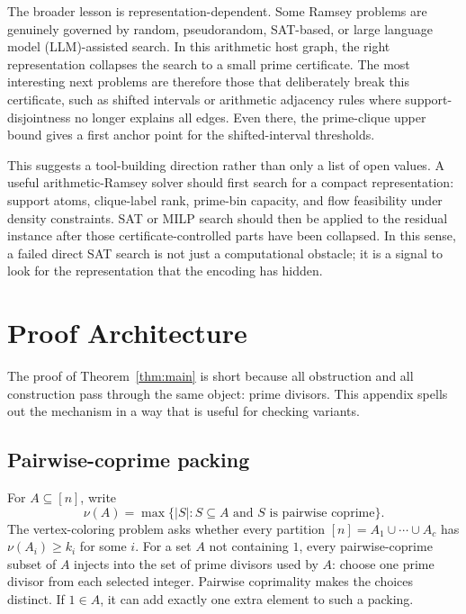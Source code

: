 \documentclass[11pt]{article}
\theoremstyle{plain}
\theoremstyle{definition}
\theoremstyle{remark}
\begin{document}
The broader lesson is representation-dependent.  Some Ramsey problems are
genuinely governed by random, pseudorandom, SAT-based, or large language
model (LLM)-assisted search.  In this arithmetic host graph, the right
representation collapses the search to a small prime certificate.  The most
interesting next problems are therefore those that deliberately break this
certificate, such as shifted intervals or arithmetic adjacency rules where
support-disjointness no longer explains all edges.  Even there, the
prime-clique upper bound gives a first anchor point for the shifted-interval
thresholds.

This suggests a tool-building direction rather than only a list of open
values.  A useful arithmetic-Ramsey solver should first search for a compact
representation: support atoms, clique-label rank, prime-bin capacity, and
flow feasibility under density constraints.  SAT or MILP search should then
be applied to the residual instance after those certificate-controlled parts
have been collapsed.  In this sense, a failed direct SAT search is not just a
computational obstacle; it is a signal to look for the representation that
the encoding has hidden.

\appendix

\section{Proof Architecture}
\label{app:proof-anatomy}

The proof of Theorem~\ref{thm:main} is short because all obstruction and all
construction pass through the same object: prime divisors.  This appendix
spells out the mechanism in a way that is useful for checking variants.

\subsection{Pairwise-coprime packing}

For $A\subseteq[n]$, write
\[
  \nu(A)=\max\{|S|:S\subseteq A\text{ and }S\text{ is pairwise coprime}\}.
\]
The vertex-coloring problem asks whether every partition
$[n]=A_1\cup\cdots\cup A_c$ has $\nu(A_i)\ge k_i$ for some $i$.
For a set $A$ not containing $1$, every pairwise-coprime subset of $A$
injects into the set of prime divisors used by $A$: choose one prime divisor
from each selected integer.  Pairwise coprimality makes the choices distinct.
If $1\in A$, it can add exactly one extra element to such a packing.
\end{document}
